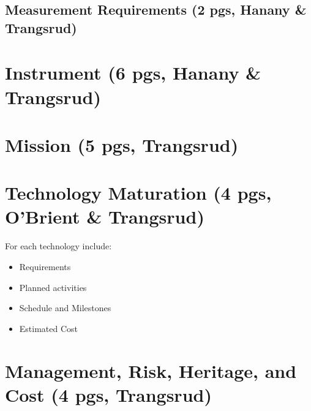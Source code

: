 \documentclass[12pt]{article}
\begin{document}

\subsection{Measurement Requirements (2 pgs, Hanany \& Trangsrud)}





\section{Instrument (6 pgs, Hanany \& Trangsrud)}




\section{Mission (5 pgs, Trangsrud)}




\section{Technology Maturation (4 pgs, O'Brient \& Trangsrud)}



For each technology include:
\begin{itemize}
\item Requirements
\item Planned activities
\item Schedule and Milestones
\item Estimated Cost
\end{itemize}


\section{Management, Risk, Heritage, and Cost (4 pgs, Trangsrud)}




\newpage




\end{document}
